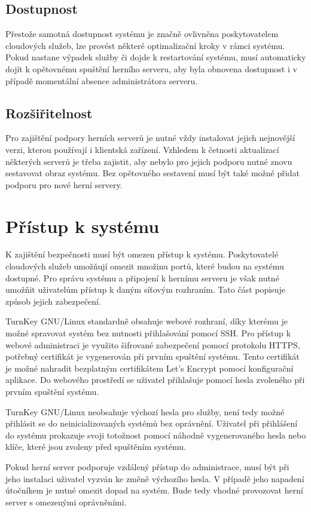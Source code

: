 \subsection{Dostupnost}

Přestože samotná dostupnost systému je značně ovlivněna poskytovatelem cloudových služeb, lze provést některé optimalizační kroky v rámci systému.
Pokud nastane výpadek služby či dojde k restartování systému, musí automaticky dojít k opětovnému spuštění herního serveru, aby byla obnovena dostupnost i v případě
momentální absence administrátora serveru.

\subsection{Rozšiřitelnost}

Pro zajištění podpory herních serverů je nutné vždy instalovat jejich nejnovější verzi, kterou používají i klientská zařízení.
Vzhledem k četnosti aktualizací některých serverů je třeba zajistit, aby nebylo pro jejich podporu nutné znovu sestavovat obraz systému.
Bez opětovného sestavení musí být také možné přidat podporu pro nové herní servery. 

\section{Přístup k systému}

K zajištění bezpečnosti musí být omezen přístup k systému. Poskytovatelé cloudových služeb
umožňují omezit množinu portů, které budou na systému dostupné. Pro správu systému a připojení k hernímu
serveru je však nutné umožňit uživatelům přístup k daným síťovým rozhraním. Tato část popisuje způsob jejich zabezpečení.

TurnKey GNU/Linux standardně obsahuje webové rozhraní,
díky kterému je možné spravovat systém bez nutnosti přihlašování pomocí SSH. Pro přístup k webové administraci
je využito šifrované zabezpečení pomocí protokolu HTTPS, potřebný certifikát je vygenerován při prvním spuštění systému.
Tento certifikát je možné nahradit bezplatným certifikátem Let's Encrypt \cite{lets_encrypt} pomocí konfigurační aplikace.
Do webového prostředí se uživatel přihlašuje pomocí hesla zvoleného při prvním spuštění systému. 

TurnKey GNU/Linux
neobsahuje výchozí hesla pro služby, není tedy možné přihlásit se do neinicializovaných systémů bez oprávnění.
Uživatel při přihlášení do systému prokazuje svoji totožnost pomocí náhodně vygenerovaného hesla nebo klíče, které
jsou zvoleny před spuštěním systému. 

Pokud herní server podporuje vzdálený přístup do administrace, musí být při jeho instalaci uživatel vyzván ke změně výchozího hesla.
V případě jeho napadení útočníkem je nutné omezit dopad na systém. Bude tedy vhodné provozovat herní server s omezenými oprávněními. 
